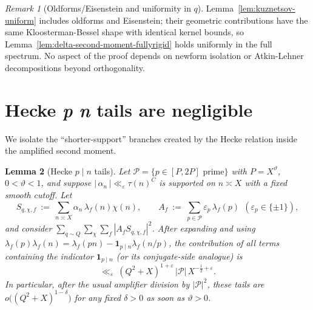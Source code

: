 \documentclass[11pt]{article}
\newtheorem{lemma}{Lemma}[part]
\theoremstyle{definition}
\theoremstyle{remark}
\newtheorem{remark}[lemma]{Remark}
\numberwithin{equation}{part}
\begin{document}
\begin{remark}[Oldforms/Eisenstein and uniformity in $q$]
	Lemma~\ref{lem:kuznetsov-uniform} includes oldforms and Eisenstein; their geometric contributions have the same Kloosterman-Bessel shape with identical kernel bounds, so Lemma~\ref{lem:delta-second-moment-fullyrigid} holds uniformly in the full spectrum. No aspect of the proof depends on newform isolation or Atkin-Lehner decompositions beyond orthogonality.
\end{remark}

\section{Hecke \textit p \textbar  \textit n tails are negligible}\label{sec:hecke-tails}

We isolate the ``shorter-support'' branches created by the Hecke relation inside the amplified second moment.

\begin{lemma}[Hecke $p\mid n$ tails]\label{lem:hecke-tails}
	Let $\mathcal P=\{p\in[P,2P]\text{ prime}\}$ with $P=X^\vartheta$, $0<\vartheta<1$,
	and suppose $|\,\alpha_n\,|\ll_\varepsilon \tau(n)^C$ is supported on $n\asymp X$ with a fixed smooth cutoff.
	Let
	\[
		S_{q,\chi,f}\ :=\ \sum_{n\asymp X}\alpha_n\,\lambda_f(n)\chi(n),
		\qquad
		A_f\ :=\ \sum_{p\in\mathcal P}\varepsilon_p\,\lambda_f(p)\ \ (\varepsilon_p\in\{\pm1\}),
	\]
	and consider $\sum_{q\sim Q}\sum_{\chi}\sum_f |A_f S_{q,\chi,f}|^2$.
	After expanding and using $\lambda_f(p)\lambda_f(n)=\lambda_f(pn)-\mathbf1_{p\mid n}\lambda_f(n/p)$,
	the contribution of all terms containing the indicator $\mathbf1_{p\mid n}$ (or its conjugate-side analogue) is
	\[
		\ll_\varepsilon\ (Q^2+X)^{1+\varepsilon}\,|\mathcal P|\,X^{-\tfrac12+\varepsilon}.
	\]
	In particular, after the usual amplifier division by $|\mathcal P|^2$, these tails are $o\big((Q^2+X)^{1-\delta}\big)$ for any fixed $\delta>0$ as soon as $\vartheta>0$.
\end{lemma}
\end{document}
